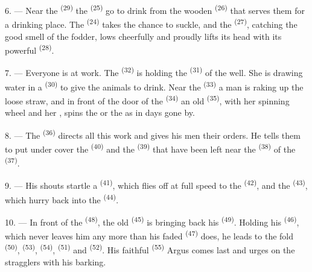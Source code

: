 6. --- Near the  \textsuperscript{(29)} the  \textsuperscript{(25)}
go to drink from the wooden  \textsuperscript{(26)} that serves them for a
drinking place. The  \textsuperscript{(24)} takes the chance to suckle, and the
 \textsuperscript{(27)}, catching the good smell of the fodder, lows cheerfully and
proudly lifts its head with its powerful
 \textsuperscript{(28)}.

7. --- Everyone is at work. The  \textsuperscript{(32)} is holding the
 \textsuperscript{(31)} of the well. She is drawing water in a 
\textsuperscript{(30)} to give the animals to drink. Near the
 \textsuperscript{(33)} a man is raking up the loose straw, and in front
of the door of the  \textsuperscript{(34)} an old
 \textsuperscript{(35)}, with her spinning wheel and her
, spins the  or the  as in days gone
by.

\VUsaut{3.0mm}
\VUsaut{3.0mm}

8. --- The  \textsuperscript{(36)} directs all this work and gives his men
their orders. He tells them to put under cover the  \textsuperscript{(40)} and
the  \textsuperscript{(39)} that have been left near the 
\textsuperscript{(38)} of the  \textsuperscript{(37)}.

9. --- His shouts startle a  \textsuperscript{(41)}, which flies off at full
speed to the  \textsuperscript{(42)}, and the 
\textsuperscript{(43)}, which hurry back into the  \textsuperscript{(44)}.

10. --- In front of the  \textsuperscript{(48)}, the old
 \textsuperscript{(45)} is bringing back his 
\textsuperscript{(49)}. Holding his  \textsuperscript{(46)}, which never leaves
him any more than his faded  \textsuperscript{(47)} does, he leads to the fold
 \textsuperscript{(50)},  \textsuperscript{(53)},
 \textsuperscript{(54)},  \textsuperscript{(51)} and
 \textsuperscript{(52)}. His faithful  \textsuperscript{(55)} Argus
comes last and urges on the stragglers with his barking.

